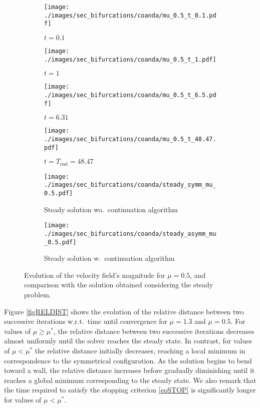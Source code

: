 \documentclass[reqno]{amsart}[standalone]
\theoremstyle{definition}
\theoremstyle{remark}
\begin{document}
\begin{figure}[ht]
\centering

\begin{subfigure}{0.47\linewidth}
\centering
\texttt{[image: ./images/sec\_bifurcations/coanda/mu\_0.5\_t\_0.1.pdf]}
\caption{$t=0.1$}
\end{subfigure}%
\hfill
\begin{subfigure}{0.47\linewidth}
\centering
\texttt{[image: ./images/sec\_bifurcations/coanda/mu\_0.5\_t\_1.pdf]}
\caption{$t=1$}
\end{subfigure}

\vspace{0.2cm}

\begin{subfigure}{0.47\linewidth}
\centering
\texttt{[image: ./images/sec\_bifurcations/coanda/mu\_0.5\_t\_6.5.pdf]}
\caption{$t = 6.31$}
\end{subfigure}%
\hfill
\begin{subfigure}{0.47\linewidth}
\centering
\texttt{[image: ./images/sec\_bifurcations/coanda/mu\_0.5\_t\_48.47.pdf]}
\caption{$t=T_\text{end}=48.47$}
\end{subfigure}

\vspace{0.2cm}

\begin{subfigure}{0.47\linewidth}
\centering
\texttt{[image: ./images/sec\_bifurcations/coanda/steady\_symm\_mu\_0.5.pdf]}
\caption{Steady solution wo.\ continuation algorithm}
\end{subfigure}%
\hfill
\begin{subfigure}{0.47\linewidth}
\centering
\texttt{[image: ./images/sec\_bifurcations/coanda/steady\_asymm\_mu\_0.5.pdf]}
\caption{Steady solution w.\ continuation algorithm}
\end{subfigure}

\caption{Evolution of the velocity field's magnitude for $\mu = 0.5$, and comparison with the solution obtained considering the steady problem.}
    \label{figEvolution2}
\end{figure}

Figure \ref{figRELDIST} shows the evolution of the relative distance between two successive iterations w.r.t.\ time until convergence for $\mu= 1.3$ and $\mu=0.5$.
%
%
%
For values of $\mu\geq\mu^\ast$, the relative distance between two successive iterations decreases almost uniformly until the solver reaches the steady state.
In contrast, for values of $\mu<\mu^\ast$ the relative distance initially decreases, reaching a local minimum in correspondence to the symmetrical configuration.
As the solution begins to bend toward a wall, the relative distance increases before gradually diminishing until it reaches a global minimum corresponding to the steady state.
We also remark that the time required to satisfy the stopping criterion \eqref{eqSTOP} is significantly longer for values of $\mu<\mu^\ast$.
\end{document}
